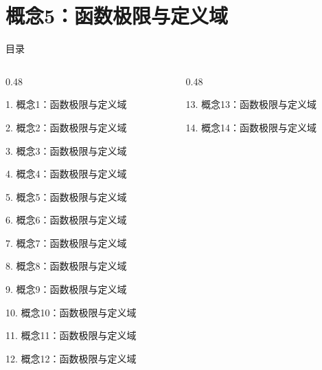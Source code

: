 \documentclass[aspectratio=169,10pt,fontset=fandol]{ctexbeamer}
\begin{document}
\section{概念5：函数极限与定义域}
\begin{frame}[t,fragile]{目录}
\small
\begin{columns}[T,onlytextwidth]
\begin{column}{0.48\textwidth}
{\color{black}\small 1. 概念1：函数极限与定义域\par}\vspace{0.22em}
{\color{black}\small 2. 概念2：函数极限与定义域\par}\vspace{0.22em}
{\color{black}\small 3. 概念3：函数极限与定义域\par}\vspace{0.22em}
{\color{black}\small 4. 概念4：函数极限与定义域\par}\vspace{0.22em}
{\color{blue}\small 5. 概念5：函数极限与定义域\par}\vspace{0.22em}
{\color{gray!40}\small 6. 概念6：函数极限与定义域\par}\vspace{0.22em}
{\color{gray!40}\small 7. 概念7：函数极限与定义域\par}\vspace{0.22em}
{\color{gray!40}\small 8. 概念8：函数极限与定义域\par}\vspace{0.22em}
{\color{gray!40}\small 9. 概念9：函数极限与定义域\par}\vspace{0.22em}
{\color{gray!40}\small 10. 概念10：函数极限与定义域\par}\vspace{0.22em}
{\color{gray!40}\small 11. 概念11：函数极限与定义域\par}\vspace{0.22em}
{\color{gray!40}\small 12. 概念12：函数极限与定义域\par}\vspace{0.22em}
\end{column}
\begin{column}{0.48\textwidth}
{\color{gray!40}\small 13. 概念13：函数极限与定义域\par}\vspace{0.22em}
{\color{gray!40}\small 14. 概念14：函数极限与定义域\par}\vspace{0.22em}

\end{column}
\end{columns}
\end{frame}
\end{document}
